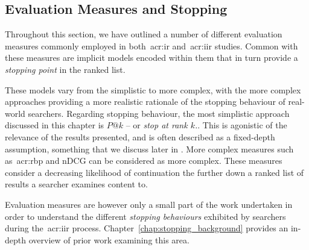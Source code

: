%
%

\subsection{Evaluation Measures and Stopping}
Throughout this section, we have outlined a number of different evaluation measures commonly employed in both~\gls{acr:ir} and~\gls{acr:iir} studies. Common with these measures are implicit models encoded within them that in turn provide a \emph{stopping point} in the ranked list.

These models vary from the simplistic to more complex, with the more complex approaches providing a more realistic rationale of the stopping behaviour of real-world searchers. Regarding stopping behaviour, the most simplistic approach discussed in this chapter is $P@k$ -- or \emph{stop at rank $k$.}. This is agonistic of the relevance of the results presented, and is often described as a fixed-depth assumption, something that we discuss later in . More complex measures such as~\gls{acr:rbp} and nDCG can be considered as more complex. These measures consider a decreasing likelihood of continuation the further down a ranked list of results a searcher examines content to.

Evaluation measures are however only a small part of the work undertaken in order to understand the different \emph{stopping behaviours} exhibited by searchers during the~\gls{acr:iir} process. Chapter~\ref{chap:stopping_background} provides an in-depth overview of prior work examining this area.

